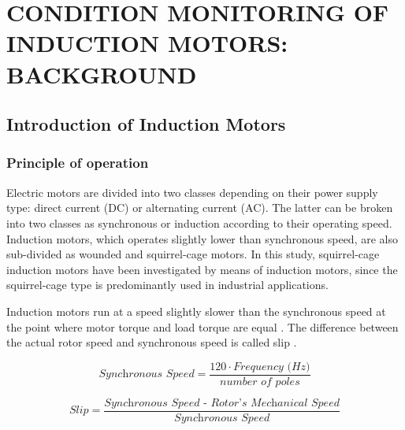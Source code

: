 \chapter{CONDITION MONITORING OF INDUCTION MOTORS: BACKGROUND }\label{Ch2}
\vspace*{-12pt} %
\section{Introduction of Induction Motors}
\subsection{Principle of operation}

Electric motors are divided into two classes depending on their power supply type: direct current (DC) or alternating current (AC). The latter can be broken into two classes as synchronous or induction according to their operating speed. Induction motors, which operates slightly lower than synchronous speed, are also sub-divided as wounded and squirrel-cage motors. In this study, squirrel-cage induction motors have been investigated by means of induction motors, since the squirrel-cage type is predominantly used in industrial applications. 

Induction motors run at a speed slightly slower than the synchronous speed at the point where motor torque and load torque are equal \cite{gunnar2016}. The difference between the actual rotor speed and synchronous speed is called slip \cite{doe2008improving}.

\begin{equation}
	\textit{Synchronous Speed} = \displaystyle \frac{120 \cdot \textit{Frequency (Hz)}}{\textit{number of poles}}
	\label{speed}
\end{equation}

\begin{equation}
	\textit{Slip} = \displaystyle \frac{\textit{Synchronous Speed - Rotor's Mechanical Speed}}{\textit{Synchronous Speed}}
	\label{slip}
\end{equation}


